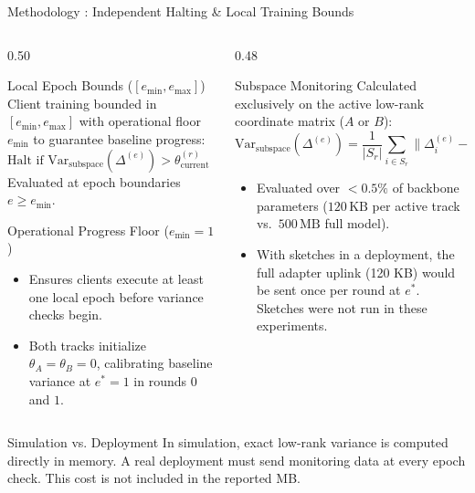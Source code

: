 \documentclass[aspectratio=169]{beamer}
\begin{document}
\begin{frame}{Methodology : Independent Halting \& Local Training Bounds}
    \vspace{-0.35em}
    \begin{columns}
        \begin{column}{0.50\textwidth}
            \begin{block}{Local Epoch Bounds ($[e_{\min}, e_{\max}]$)}
                \scriptsize
                Client training bounded in $[e_{\min}, e_{\max}]$ with operational floor $e_{\min}$ to guarantee baseline progress:
                $$\text{Halt if } \text{Var}_{\text{subspace}}(\Delta^{(e)}) > \theta_{\text{current}}^{(r)} \;\lor\; e \ge e_{\max}$$
                Evaluated at epoch boundaries $e \ge e_{\min}$.
            \end{block}
            \vspace{-0.3em}
            \begin{block}{Operational Progress Floor ($e_{\min} = 1$)}
                \scriptsize
                \begin{itemize}
                    \item Ensures clients execute at least one local epoch before variance checks begin.
                    \item Both tracks initialize $\theta_A = \theta_B = 0$, calibrating baseline variance at $e^* = 1$ in rounds $0$ and $1$.
                \end{itemize}
            \end{block}
        \end{column}
        \begin{column}{0.48\textwidth}
            \begin{block}{Subspace Monitoring}
                \scriptsize
                Calculated exclusively on the active low-rank coordinate matrix ($A$ or $B$):
                $$\text{Var}_{\text{subspace}}(\Delta^{(e)}) = \frac{1}{|S_r|} \sum_{i \in S_r} \|\Delta_i^{(e)} - \bar{\Delta}^{(e)}\|_2^2$$
                \begin{itemize}
                    \item Evaluated over $<0.5\%$ of backbone parameters ($120\,\text{KB}$ per active track vs.\ $500\,\text{MB}$ full model).
                    \item With sketches in a deployment, the full adapter uplink (120 KB) would be sent once per round at $e^*$. Sketches were not run in these experiments.
                \end{itemize}
            \end{block}
        \end{column}
    \end{columns}
    \vspace{0.1em}
    \begin{alertblock}{Simulation vs. Deployment}
        \scriptsize
        In simulation, exact low-rank variance is computed directly in memory. A real deployment must send monitoring data at every epoch check. This cost is not included in the reported MB.
    \end{alertblock}
\end{frame}
\end{document}
